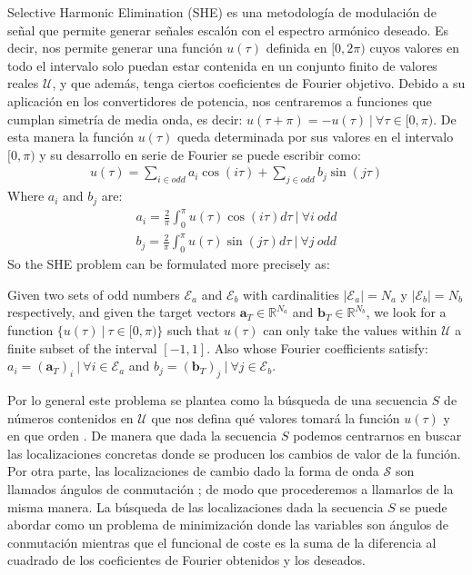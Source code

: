 Selective Harmonic Elimination (SHE) \cite{Rodriguez2002} es una metodología de modulación de señal que permite generar señales escalón con el espectro armónico deseado. 
%
Es decir, nos permite generar una función $u(\tau)$ definida en $[0,2\pi)$ cuyos valores en todo el intervalo solo puedan estar contenida en un conjunto  finito de valores reales $\mathcal{U}$, y que además, tenga ciertos coeficientes de Fourier objetivo. 
%
Debido a su aplicación en los convertidores de potencia, nos centraremos a funciones que cumplan simetría de media onda, es decir: $u(\tau + \pi) = -u(\tau) \ | \ \forall \tau \in [0,\pi)$. De esta manera la función $u(\tau)$ queda determinada por sus valores en el intervalo $[0,\pi)$ y su desarrollo en serie de Fourier se puede escribir como:
\begin{gather}
    u(\tau ) = \sum_{i \in odd} a_i \cos(i\tau)+ \sum_{j \in odd}  b_j \sin(j \tau) 
\end{gather}
Where $a_i$ and $b_j$  are:
\begin{gather}
    a_i = \frac{2}{\pi} \int_0^\pi u(\tau ) \cos(i \tau)d\tau \ | \ \forall i \ odd \label{an}\\
    b_j = \frac{2}{\pi} \int_0^\pi u(\tau)  \sin(j \tau) d\tau \ | \ \forall j \ odd \label{bn}
\end{gather}
So the SHE problem can be formulated more precisely as:
\begin{problem}[SHE]\label{SHEp}
    Given two sets of odd numbers $ \mathcal{E} _a $ and $ \mathcal{E} _b $ with cardinalities $ | \mathcal{E} _a | = N_a $ y $ | \mathcal{E} _b | = N_b $ respectively, 
    and given the target vectors $ \bm {a} _T \in \mathbb {R}^{N_a} $ and $ \bm {b} _T \in \mathbb {R} ^ {N_b} $, we look for a function $ \{u (\tau) \ | \ \tau \in [0, \pi) \} $ such that $ u (\tau) $ can only take the values within $ \mathcal{U} $ a finite subset of the interval $ [- 1,1] $. 
    Also whose Fourier coefficients satisfy: $ a_i = (\bm {a} _T) _i \ | \ \forall i \in \mathcal{E} _a $ and $ b_j = (\bm {b} _T) _j \ | \ \forall j \in \mathcal{E} _b $.
\end{problem}



Por lo general este problema se plantea como la búsqueda de una secuencia $S$ de números contenidos en $\mathcal{U}$ que nos defina qué valores tomará la función $u(\tau)$ y en que orden \cite{Konstantinou2010}.
%
De manera que dada la secuencia $S$ podemos centrarnos en buscar las localizaciones concretas donde se producen los cambios de valor de la función.
%
Por otra parte, las localizaciones de cambio dado la forma de onda $\mathcal{S}$ son llamados ángulos de conmutación \cite{Yang2015,Konstantinou2010,Sun1996}; de modo que procederemos a llamarlos de  la misma manera.
%
La búsqueda de las localizaciones dada la secuencia $S$ se puede abordar como un problema de minimización donde las variables son ángulos de conmutación mientras que el funcional de coste es la suma de la diferencia al cuadrado de los coeficientes de Fourier obtenidos y los deseados.
\newline 


